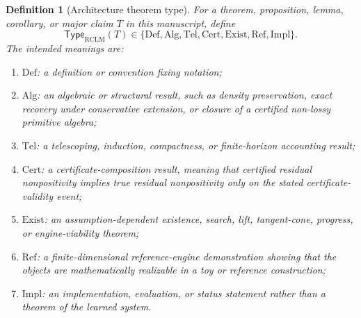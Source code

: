 \documentclass[11pt,a4paper]{article}
\newtheorem{definition}[theorem]{Definition}
\newcommand{\RCLM}{\mathrm{RCLM}}
\begin{document}
\begin{definition}[Architecture theorem type]
\label{def:rclm-theorem-type}
For a theorem, proposition, lemma, corollary, or major claim \(T\) in this manuscript, define
\[
\mathsf{Type}_{\RCLM}(T)\in
\{\mathrm{Def},\mathrm{Alg},\mathrm{Tel},\mathrm{Cert},\mathrm{Exist},\mathrm{Ref},\mathrm{Impl}\}.
\]
The intended meanings are:
\begin{enumerate}[label=(\roman*),leftmargin=1.5em]
    \item \(\mathrm{Def}\): a definition or convention fixing notation;
    \item \(\mathrm{Alg}\): an algebraic or structural result, such as density preservation, exact recovery under conservative extension, or closure of a certified non-lossy primitive algebra;
    \item \(\mathrm{Tel}\): a telescoping, induction, compactness, or finite-horizon accounting result;
    \item \(\mathrm{Cert}\): a certificate-composition result, meaning that certified residual nonpositivity implies true residual nonpositivity only on the stated certificate-validity event;
    \item \(\mathrm{Exist}\): an assumption-dependent existence, search, lift, tangent-cone, progress, or engine-viability theorem;
    \item \(\mathrm{Ref}\): a finite-dimensional reference-engine demonstration showing that the objects are mathematically realizable in a toy or reference construction;
    \item \(\mathrm{Impl}\): an implementation, evaluation, or status statement rather than a theorem of the learned system.
\end{enumerate}
\end{definition}
\end{document}
